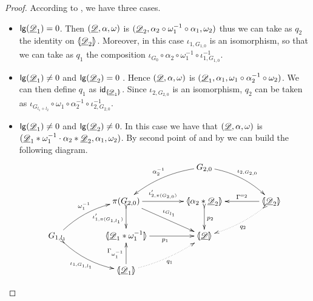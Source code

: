 \begin{proof}According to , we have three cases.
\begin{itemize}
	\item $\mathsf{lg}(\underline{\mathscr{D}}_1)=0$. Then  $(\underline{\mathscr{D}}, \alpha, \omega)$ is $(\underline{\mathscr{D}}_2, \alpha_2\circ \omega_1^{-1}\circ \alpha_1, \omega_2)$ thus we can take as $q_2$ the identity on $\langle \hspace{-1.85pt}[ \underline{\mathscr{D}}_2]\hspace{-1.85pt}\rangle$. Moreover, in this case $\iota_{1,G_{1,0}}$ is an isomorphism, so that we can take as $q_1$ the composition $\iota_{G_0}\circ \alpha_2\circ \omega^{-1}_1 \circ \iota^{-1}_{1,G_{1,0}}$.
	\item $\mathsf{lg}(\underline{\mathscr{D}}_1)\neq 0$ and $\mathsf{lg}(\underline{\mathscr{D}}_2)=0$ . Hence  $(\underline{\mathscr{D}}, \alpha, \omega)$ is $(\underline{\mathscr{D}}_1, \alpha_1, \omega_1 \circ \alpha^{-1}_2\circ \omega_2)$. We can then define $q_1$ as $\mathsf{id}_{\langle \hspace{-1.85pt}[ \underline{\mathscr{D}}_1]\hspace{-1.85pt}\rangle}$.  Since $\iota_{2,G_{2,0}}$ is an isomorphism, $q_2$ can be taken as  $\iota_{G_{l_1+l_2}}\circ  \omega_1  \circ \alpha^{-1}_2 \circ \iota^{-1}_{2,G_{2,0}}$.
	\item  $\mathsf{lg}(\underline{\mathscr{D}}_1)\neq 0$ and $\mathsf{lg}(\underline{\mathscr{D}}_2)\neq 0$. In this case we have that $(\underline{\mathscr{D}}, \alpha, \omega)$  is $(\underline{\mathscr{D}}_1*\omega_1^{-1}\cdot \alpha_2*\underline{\mathscr{D}}_2, \alpha_1, \omega_2)$. By second point of  and by  we can build the following diagram.
	\[\xymatrix@C=40pt{&&G_{2,0}  \ar@/_.3cm/[dl]_{\alpha^{-1}_2} \ar@/^.3cm/[dr]^{\iota_{2, G_{2,0}}}\\&\pi(G_{2,0}) \ar[dr]^{\iota_{G_{l_1}}}\ar[r]^-{\iota'_{2, \pi(G_{2,0})}} \ar@{>->}[d]_-{\iota'_{1, \pi(G_{1,l_1})}} & \lpro \alpha_2*\der{D}_2 \rpro \ar@{>->}[d]^{p_2} &\tproi{D}{2} \ar[l]_-{\Gamma^{\alpha_2}} \ar@{>.>}@/^.2cm/[dl]^{q_2}\\ G_{1,l_1}  \ar@/^.3cm/[ur]^{\omega^{-1}_1}  \ar@{>->}@/_.3cm/[dr]_{\iota_{1, G_{1, l_1}}}& \lpro \der{D}_1*\omega_1^{-1} \rpro  \ar[r]_{p_1}& \tpro{D} \\ &\tproi{D}{1} \ar[u]^{\Gamma_{\omega^{-1}_1}}  \ar@{.>}@/_.2cm/[ur]_{q_1}}\]


\end{itemize}
\end{proof}
